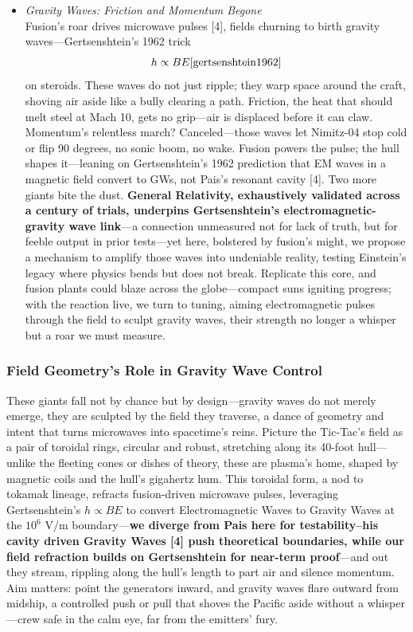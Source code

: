 \documentclass[11pt]{article}
\begin{document}
\begin{itemize}
		\item \textit{Gravity Waves: Friction and Momentum Begone} \\
		Fusion’s roar drives microwave pulses [4], fields churning to birth gravity waves—Gertsenshtein’s 1962 trick
		\begin{equation}
			h \propto B E \cite{gertsenshtein1962}
		\end{equation}
		on steroids. These waves do not just ripple; they warp space around the craft, shoving air aside like a bully clearing a path. Friction, the heat that should melt steel at Mach 10, gets no grip—air is displaced before it can claw. Momentum’s relentless march? Canceled—those waves let Nimitz-04 stop cold or flip 90 degrees, no sonic boom, no wake. Fusion powers the pulse; the hull shapes it—leaning on Gertsenshtein’s 1962 prediction \cite{gertsenshtein1962} that EM waves in a magnetic field convert to GWs, not Pais’s resonant cavity [4]. Two more giants bite the dust. \textbf{General Relativity, exhaustively validated across a century of trials, underpins Gertsenshtein's electromagnetic-gravity wave link}—a connection unmeasured not for lack of truth, but for feeble output in prior tests—yet here, bolstered by fusion’s might, we propose a mechanism to amplify those waves into undeniable reality, testing Einstein’s legacy where physics bends but does not break. Replicate this core, and fusion plants could blaze across the globe—compact suns igniting progress; with the reaction live, we turn to tuning, aiming electromagnetic pulses through the field to sculpt gravity waves, their strength no longer a whisper but a roar we must measure.
	\end{itemize}
	
	\subsubsection{Field Geometry’s Role in Gravity Wave Control}
	These giants fall not by chance but by design—gravity waves do not merely emerge, they are sculpted by the field they traverse, a dance of geometry and intent that turns microwaves into spacetime’s reins. Picture the Tic-Tac’s field as a pair of toroidal rings, circular and robust, stretching along its 40-foot hull—unlike the fleeting cones or dishes of theory, these are plasma’s home, shaped by magnetic coils and the hull’s gigahertz hum. This toroidal form, a nod to tokamak lineage, refracts fusion-driven microwave pulses, leveraging Gertsenshtein’s \(h \propto B E\) \cite{gertsenshtein1962} to convert Electromagnetic Waves to Gravity Waves at the $10^6$ V/m boundary—\textbf{we diverge from Pais here for testability--his cavity driven Gravity Waves [4] push theoretical boundaries, while our field refraction builds on Gertsenshtein for near-term proof}—and out they stream, rippling along the hull’s length to part air and silence momentum. Aim matters: point the generators inward, and gravity waves flare outward from midship, a controlled push or pull that shoves the Pacific aside without a whisper—crew safe in the calm eye, far from the emitters’ fury.
	
\end{document}
